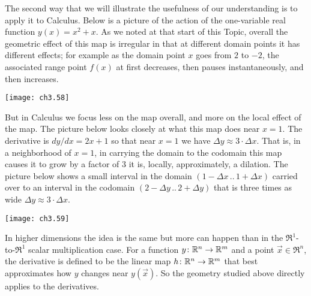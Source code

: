 The second way that we will illustrate the usefulness of
our understanding is to apply it to Calculus.
Below is a picture
of the action of the one-variable real function \( y(x)=x^2+x \).
As we noted 
at that start of this Topic, overall the geometric effect of this map is
irregular in that at different domain points it has different effects; for
example as the domain point $x$ goes from $2$ to $-2$, the associated range
point $f(x)$ at first decreases, then pauses instantaneously,
and then increases.
\begin{center}
  \texttt{[image: ch3.58]}
\end{center}
But in Calculus we focus less on the map overall, and more 
on the local effect of the map.
The picture below looks closely at what this map
does near $x=1$.
The derivative is $dy/dx=2x+1$
so that near \( x=1 \) 
we have \( \Delta y\approx 3\cdot\Delta x \).
That is, in a neighborhood of $x=1$,
in carrying the domain to the codomain this map causes it to grow by
a factor of $3$ \Dash  it is, locally, 
approximately, a dilation.
The picture below shows a small interval 
in the domain $(1-\Delta x\,..\,1+\Delta x)$
carried over to an interval in the codomain $(2-\Delta y\,..\,2+\Delta y)$
that is three times as wide $\Delta y \approx 3\cdot \Delta x$.
\begin{center}
  \texttt{[image: ch3.59]}
\end{center}

In higher dimensions the idea is the same but more can happen than in the 
$\Re^1$-to-$\Re^1$ scalar multiplication case.
For a function \( \mbox{$y\colon \mathbb{R}^n\to \mathbb{R}^m$} \) and a point \( \vec{x}\in\Re^n \),
the derivative is defined to be the 
linear map \( \mbox{$h\colon \mathbb{R}^n\to \mathbb{R}^m$} \) that best approximates
how \( y \) changes near \( y(\vec{x}) \).
So the geometry studied above directly applies to the derivatives.

